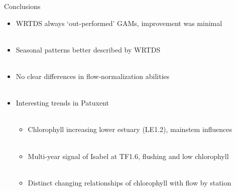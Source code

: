 \documentclass[serif]{beamer}\usepackage[]{graphicx}\usepackage[]{color}
\begin{document}
\begin{frame}{Conclusions}
\begin{itemize}
\item WRTDS always `out-performed' GAMs, improvement was minimal \\~\\
\item Seasonal patterns better described by WRTDS \\~\\
\item No clear differences in flow-normalization abilities \\~\\
\item Interesting trends in Patuxent \\~\\
\begin{itemize}
\item Chlorophyll increasing lower estuary (LE1.2), mainstem influences \\~\\
\item Multi-year signal of Isabel at TF1.6, flushing and low chlorophyll \\~\\
\item Distinct changing relationships of chlorophyll with flow by station
\end{itemize}
\end{itemize}

\end{frame}
\end{document}

